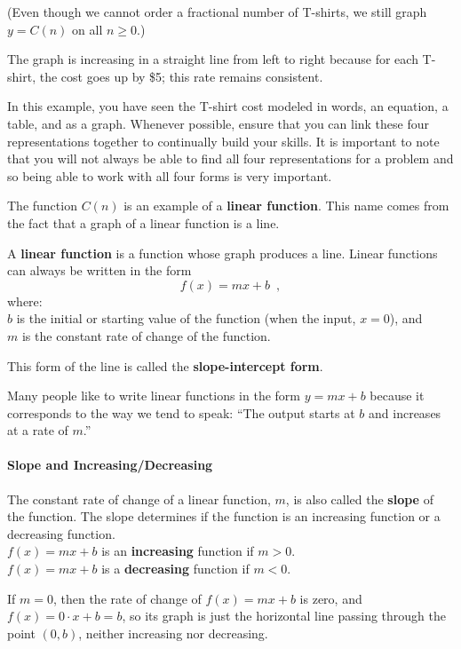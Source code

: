  (Even though we cannot order a fractional number of T-shirts, we still graph $y=C(n)$ on all $n\ge 0$.)

The graph is increasing in a straight line from left to right because for each T-shirt, the cost goes up by \$5; this rate remains consistent.

In this example, you have seen the T-shirt cost modeled in words, an equation, a table, and as a graph. Whenever possible, ensure that you can link these four representations together to continually build your skills. It is important to note that you will not always be able to find all four representations for a problem and so being able to work with all four forms is very important.

The function $C(n)$ is an example of a {\bf linear function}. This name comes from the fact that a graph of a linear function is a line.


\begin{definition}
A \textbf{linear function} is a function whose graph produces a line. Linear functions can always be written in the form
$$f(x) = mx +b \enspace ,$$
where:\\
$b$ is the initial or starting value of the function (when the input, $x = 0$), and\\
$m$ is the constant rate of change of the function.

This form of the line is called the {\bf slope-intercept form}.
\end{definition}

Many people like to write linear functions in the form $y=mx + b$ because it corresponds to the way we tend to speak: ``The output starts at $b$ and increases at a rate of $m$.''

\paragraph{Slope and Increasing/Decreasing}

The constant rate of change of a linear function, $m$, is also called the \textbf{slope} of the function. The slope determines if the function is an increasing function or a decreasing function.\\
$f(x) = mx + b$ is an \textbf{increasing} function if $m>0$.\\
$f(x) = mx + b$ is a \textbf{decreasing} function if $m<0$.

If $m=0$, then the rate of change of $f(x) = mx+b$ is zero, and $f(x) = 0\cdot x+b = b$, so its graph is just the horizontal line passing through the point $(0, b)$, neither increasing nor decreasing.

